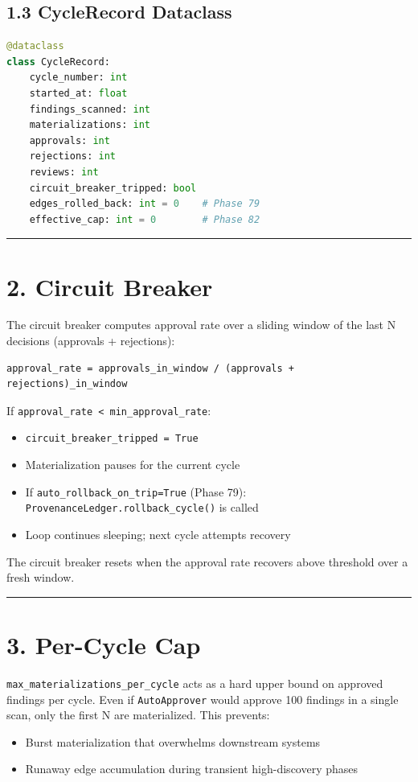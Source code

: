 \subsection*{1.3 CycleRecord Dataclass}

\begin{lstlisting}[language=Python]
@dataclass
class CycleRecord:
    cycle_number: int
    started_at: float
    findings_scanned: int
    materializations: int
    approvals: int
    rejections: int
    reviews: int
    circuit_breaker_tripped: bool
    edges_rolled_back: int = 0    # Phase 79
    effective_cap: int = 0        # Phase 82
\end{lstlisting}

\medskip\noindent\rule{\linewidth}{0.4pt}\medskip

\section*{2. Circuit Breaker}

The circuit breaker computes approval rate over a sliding window of the last N decisions (approvals + rejections):

\begin{lstlisting}
approval_rate = approvals_in_window / (approvals + rejections)_in_window
\end{lstlisting}

If \texttt{approval\_rate < min\_approval\_rate}:
\begin{itemize}
  \item \texttt{circuit\_breaker\_tripped = True}
  \item Materialization pauses for the current cycle
  \item If \texttt{auto\_rollback\_on\_trip=True} (Phase 79): \texttt{ProvenanceLedger.rollback\_cycle()} is called
  \item Loop continues sleeping; next cycle attempts recovery
\end{itemize}


The circuit breaker resets when the approval rate recovers above threshold over a fresh window.

\medskip\noindent\rule{\linewidth}{0.4pt}\medskip

\section*{3. Per-Cycle Cap}

\texttt{max\_materializations\_per\_cycle} acts as a hard upper bound on approved findings per cycle. Even if \texttt{AutoApprover} would approve 100 findings in a single scan, only the first N are materialized. This prevents:
\begin{itemize}
  \item Burst materialization that overwhelms downstream systems
  \item Runaway edge accumulation during transient high-discovery phases
\end{itemize}



